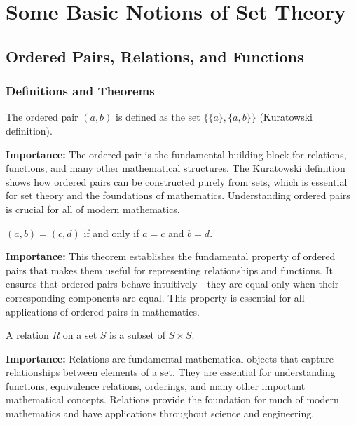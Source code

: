 \chapter{Some Basic Notions of Set Theory}

\section{Ordered Pairs, Relations, and Functions}

\subsection*{Definitions and Theorems}

\begin{definition}
The ordered pair $(a,b)$ is defined as the set $\{\{a\}, \{a,b\}\}$ (Kuratowski definition).
\end{definition}

\noindent\textbf{Importance:} The ordered pair is the fundamental building block for relations, functions, and many other mathematical structures. The Kuratowski definition shows how ordered pairs can be constructed purely from sets, which is essential for set theory and the foundations of mathematics. Understanding ordered pairs is crucial for all of modern mathematics.



\begin{theorem}
$(a,b) = (c,d)$ if and only if $a=c$ and $b=d$.
\end{theorem}

\noindent\textbf{Importance:} This theorem establishes the fundamental property of ordered pairs that makes them useful for representing relationships and functions. It ensures that ordered pairs behave intuitively - they are equal only when their corresponding components are equal. This property is essential for all applications of ordered pairs in mathematics.



\begin{definition}[Relation]
A relation $R$ on a set $S$ is a subset of $S \times S$.
\end{definition}

\noindent\textbf{Importance:} Relations are fundamental mathematical objects that capture relationships between elements of a set. They are essential for understanding functions, equivalence relations, orderings, and many other important mathematical concepts. Relations provide the foundation for much of modern mathematics and have applications throughout science and engineering.





